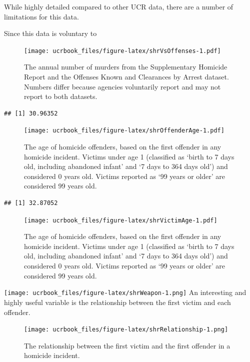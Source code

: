 \documentclass[
  12pt,
  openany]{book}
\begin{document}
While highly detailed compared to other UCR data, there are a number of limitations for this data.

Since this data is voluntary to

\begin{figure}
\centering
\texttt{[image: ucrbook\_files/figure-latex/shrVsOffenses-1.pdf]}
\caption{\label{fig:shrVsOffenses}The annual number of murders from the Supplementary Homicide Report and the Offenses Known and Clearances by Arrest dataset. Numbers differ because agencies voluntarily report and may not report to both datasets.}
\end{figure}

\begin{verbatim}
## [1] 30.96352
\end{verbatim}

\begin{figure}
\centering
\texttt{[image: ucrbook\_files/figure-latex/shrOffenderAge-1.pdf]}
\caption{\label{fig:shrOffenderAge}The age of homicide offenders, based on the first offender in any homicide incident. Victims under age 1 (classified as `birth to 7 days old, including abandoned infant' and `7 days to 364 days old') and considered 0 years old. Victims reported as `99 years or older' are considered 99 years old.}
\end{figure}

\begin{verbatim}
## [1] 32.87052
\end{verbatim}

\begin{figure}
\centering
\texttt{[image: ucrbook\_files/figure-latex/shrVictimAge-1.pdf]}
\caption{\label{fig:shrVictimAge}The age of homicide offenders, based on the first offender in any homicide incident. Victims under age 1 (classified as `birth to 7 days old, including abandoned infant' and `7 days to 364 days old') and considered 0 years old. Victims reported as `99 years or older' are considered 99 years old.}
\end{figure}

\texttt{[image: ucrbook\_files/figure-latex/shrWeapon-1.png]}
An interesting and highly useful variable is the relationship between the first victim and each offender.

\begin{figure}
\centering
\texttt{[image: ucrbook\_files/figure-latex/shrRelationship-1.png]}
\caption{\label{fig:shrRelationship}The relationship between the first victim and the first offender in a homicide incident.}
\end{figure}
\end{document}
